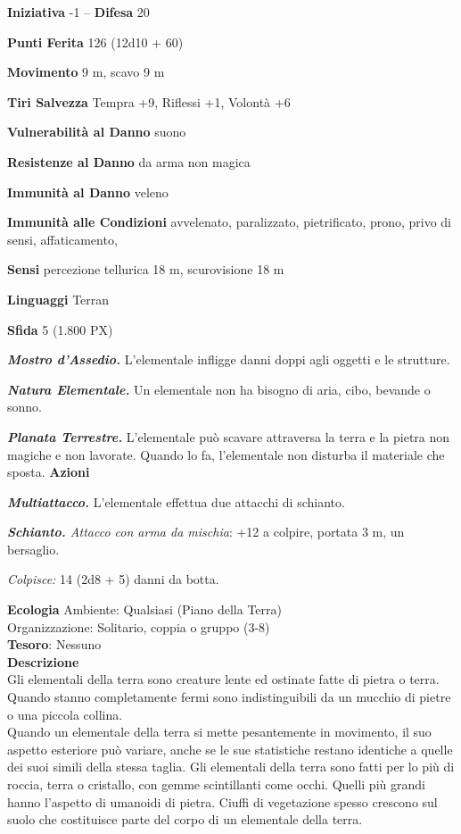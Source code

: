 \begin{multicols}{2}
	\textbf{Iniziativa} -1 -- \textbf{Difesa} 20

	\textbf{Punti Ferita} 126 (12d10 + 60)

	\textbf{Movimento} 9 m, scavo 9 m

	\textbf{Tiri Salvezza} Tempra +9, Riflessi +1, Volontà +6

	\textbf{Vulnerabilità al Danno} suono

	\textbf{Resistenze al Danno} da arma non magica

	\textbf{Immunità al Danno} veleno

	\textbf{Immunità alle Condizioni} avvelenato, paralizzato, pietrificato, prono, privo di sensi, affaticamento,

	\textbf{Sensi} percezione tellurica 18 m, scurovisione 18 m

	\textbf{Linguaggi} Terran

	\textbf{Sfida} 5 (1.800 PX)

	\textit{\textbf{Mostro d'Assedio.}} L'elementale infligge danni doppi agli oggetti e le strutture.

	\textit{\textbf{Natura Elementale.}} Un elementale non ha bisogno di aria, cibo, bevande o sonno.

	\textit{\textbf{Planata Terrestre.}} L'elementale può scavare attraversa la terra e la pietra non magiche e non lavorate. Quando lo fa, l'elementale non disturba il materiale che sposta.
	\textbf{Azioni}

	\textit{\textbf{Multiattacco.}} L'elementale effettua due attacchi di schianto.

	\textit{\textbf{Schianto.} Attacco con arma da mischia}: +12 a colpire, portata 3 m, un bersaglio.

	\textit{Colpisce:} 14 (2d8 + 5) danni da botta.

	\textbf{Ecologia}
	Ambiente: Qualsiasi (Piano della Terra)\\
	Organizzazione: Solitario, coppia o gruppo (3-8)\\
	\textbf{Tesoro}: Nessuno\\
	\textbf{Descrizione}\\
	Gli elementali della terra sono creature lente ed ostinate fatte di pietra o terra. Quando stanno completamente fermi sono indistinguibili da un mucchio di pietre o una piccola collina.\\

	Quando un elementale della terra si mette pesantemente in movimento, il suo aspetto esteriore può variare, anche se le sue statistiche restano identiche a quelle dei suoi simili della stessa taglia. Gli elementali della terra sono fatti per lo più di roccia, terra o cristallo, con gemme scintillanti come occhi. Quelli più grandi hanno l'aspetto di umanoidi di pietra. Ciuffi di vegetazione spesso crescono sul suolo che costituisce parte del corpo di un elementale della terra.\\


\end{multicols}
